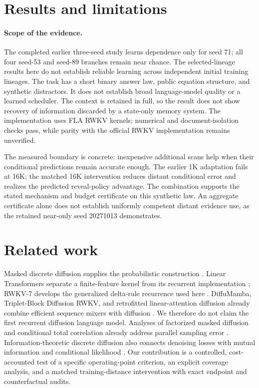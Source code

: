 \documentclass{article}
\begin{document}


\section{Results and limitations}


\paragraph{Scope of the evidence.}
The completed earlier three-seed study learns dependence only for seed 71;
all four seed-53 and seed-89 branches remain near chance. The selected-lineage
results here do not establish reliable learning across independent initial
training lineages. The task has
a short binary answer law, public equation structure, and synthetic distractors.
It does not establish broad language-model quality or a learned scheduler.
The context is retained in full, so the result does not show recovery of
information discarded by a state-only memory system. The implementation uses
FLA RWKV kernels; numerical and document-isolation checks pass, while parity
with the official RWKV implementation remains unverified.

The measured boundary is concrete: inexpensive additional scans help when
their conditional predictions remain accurate enough. The earlier 1K adaptation
fails at 16K; the matched 16K intervention reduces distant conditional error and
realizes the predicted reveal-policy advantage. The combination supports the
stated mechanism and budget certificate on this synthetic law. An aggregate
certificate alone does not establish uniformly competent distant evidence use,
as the retained near-only seed 20271013 demonstrates.

\section{Related work}
Masked discrete diffusion supplies the probabilistic construction
\citep{d3pm,mdlm}. Linear Transformers separate a finite-feature kernel from its
recurrent implementation \citep{lineartransformer}; RWKV-7 develops the
generalized delta-rule recurrence used here \citep{rwkv7}. DiffuMamba,
Triplet-Block Diffusion RWKV, and retrofitted linear-attention diffusion already
combine efficient sequence mixers with diffusion
\citep{diffumamba,triplet,retrofit}. We therefore do not claim the first recurrent
diffusion language model. Analyses of factorized masked diffusion and
conditional total correlation already address parallel sampling error
\citep{factorization2025,ctcdepth2026,intrinsicdependence2026}.
Information-theoretic discrete diffusion also connects denoising losses with
mutual information and conditional likelihood \citep{infodiscrete2025}.
Our contribution is a controlled, cost-accounted test of a specific
operating-point criterion, an explicit coverage analysis, and a matched
training-distance intervention with exact endpoint and counterfactual audits.
\end{document}
